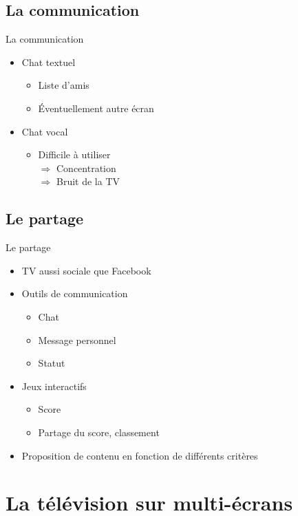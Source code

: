 \documentclass{beamer}
\begin{document}
	\subsection{La communication}
	\begin{frame}{La communication}
\begin{itemize}
	\item Chat textuel
		\begin{itemize}
			\item Liste d'amis
			\item Éventuellement autre écran
		\end{itemize}
		\vfill
	\item Chat vocal
		\begin{itemize}
			\item Difficile à utiliser \\
				$\Rightarrow$ Concentration\\
				$\Rightarrow$ Bruit de la TV
		\end{itemize}
		\vfill
\end{itemize}
	\end{frame}
	\subsection{Le partage}
	\begin{frame}{Le partage}
	\begin{itemize}
		\item TV aussi sociale que Facebook
			\vfill
		\item Outils de communication
			\begin{itemize}
				\item Chat
				\item Message personnel
				\item Statut
			\end{itemize}
			\vfill
		\item Jeux interactifs
			\begin{itemize}
				\item Score
				\item Partage du score, classement
			\end{itemize}
			\vfill
		\item Proposition de contenu en fonction de différents critères
			\vfill
	\end{itemize}
\end{frame}
	\section{La télévision sur multi-écrans}
\end{document}
